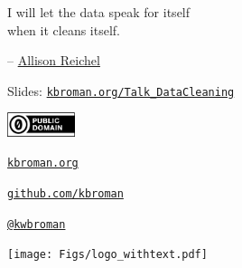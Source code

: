 \documentclass[aspectratio=169,12pt,t]{beamer}
\begin{document}
\begin{frame}[c]{}

\centering
\Large

I will let the data speak for itself \\[3pt]
when it cleans itself.

\bigskip\bigskip

\hspace{5cm} --
\href{https://twitter.com/AllisonReichel}{Allison Reichel}



\end{frame}



\begin{frame}{}

\Large

Slides: \href{https://kbroman.org/Talk_DataCleaning}{\tt kbroman.org/Talk\_DataCleaning}

\vspace*{-7mm}
\hfill
\href{https://creativecommons.org/publicdomain/zero/1.0/}{\includegraphics[height=7mm]{Figs/cc-zero.png}}

\vspace{-1mm}

\href{https://kbroman.org}{\tt \lolit kbroman.org}

\vspace{1mm}

\href{https://github.com/kbroman}{\tt \lolit github.com/kbroman}

\vspace{1mm}

\href{https://twitter.com/kwbroman}{\tt \lolit @kwbroman}



\vspace*{-4mm} \hspace*{50mm}
\texttt{[image: Figs/logo\_withtext.pdf]}



\end{frame}
\end{document}
